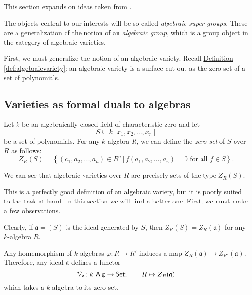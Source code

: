 \documentclass[a4paper,10pt]{scrreprt}
\def\mhyp{{\hbox{-}}}
\theoremstyle{definition}
\theoremstyle{plain}
\theoremstyle{remark}
\begin{document}
This section expands on ideas taken from \cite{milne-affine-group-schemes}.

The objects central to our interests will be so-called \emph{algebraic super-groups}. These are a generalization of the notion of an \emph{algebraic group}, which is a group object in the category of algebraic varieties.

First, we must generalize the notion of an algebraic variety. Recall \hyperref[def:algebraicvariety]{Definition \ref*{def:algebraicvariety}}: an algebraic variety is a surface cut out as the zero set of a set of polynomials. 

\subsection{Varieties as formal duals to algebras}

Let $k$ be an algebraically closed field of characteristic zero and let 
\begin{equation*}
  S \subseteq k[x_{1}, x_{2}, \ldots, x_{n}] 
\end{equation*}
be a set of polynomials. For any $k$-algebra $R$, we can define the \emph{zero set} of $S$ over $R$ as follows:
\begin{equation*}
  Z_{R}(S) = \left\{ (a_{1}, a_{2}, \ldots, a_{n}) \in R^{n} \,\big|\, f(a_{1}, a_{2}, \ldots, a_{n}) = 0\text{ for all }f \in S \right\}.
\end{equation*}

We can see that algebraic varieties over $R$ are precisely sets of the type $Z_{R}(S)$.

This is a perfectly good definition of an algebraic variety, but it is poorly suited to the task at hand. In this section we will find a better one. First, we must make a few observations.

Clearly, if $\mathfrak{a} = (S)$ is the ideal generated by $S$, then $Z_{R}(S) = Z_{R}(\mathfrak{a})$ for any $k$-algebra $R$. 

Any homomorphism of $k$-algebras $\varphi\colon R \to R'$ induces a map $Z_{R}(\mathfrak{a}) \to Z_{R'}(\mathfrak{a})$. Therefore, any ideal $\mathfrak{a}$ defines a functor 
\begin{equation*}
  \mathcal{V}_{\mathfrak{a}}\colon k\mhyp\mathsf{Alg} \to \mathsf{Set};\qquad R \mapsto Z_{R}(\mathfrak{a})
\end{equation*}
which takes a $k$-algebra to its zero set.
\end{document}

